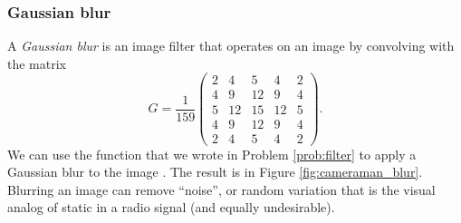 \subsubsection*{Gaussian blur}
A \emph{Gaussian blur} is an image filter that operates on an image by convolving with the matrix
\[
G = \frac{1}{159}\begin{pmatrix}
2&4&5&4&2\\
4&9&12&9&4\\
5&12&15&12&5\\
4&9&12&9&4\\
2&4&5&4&2
\end{pmatrix}.
\]
We can use the function  that we wrote in Problem \ref{prob:filter} to apply a Gaussian blur to the image . 
The result is in Figure \ref{fig:cameraman_blur}.
Blurring an image can remove ``noise'', or random variation that is the visual analog of static in a radio signal (and equally undesirable).

